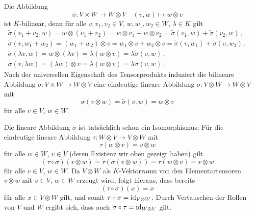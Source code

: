 \begin{example}
\begin{itemize}
      Die Abbildung
      \[
                \tilde{\sigma}
        \colon  V \times W
        \to     W \otimes V
        \quad   (v,w)
        \mapsto w \otimes v
      \]
      ist $K$-bilinear, denn für alle $v, v_1, v_2 \in V$, $w, w_1, w_2 \in W$, $\lambda \in K$ gilt
      \begin{gather*}
          \tilde{\sigma}(v_1 + v_2, w)
        = w \otimes (v_1 + v_2)
        = w \otimes v_1 + w \otimes v_2
        = \tilde{\sigma}(v_1, w) + \tilde{\sigma}(v_2, w) \,,
        \\
          \tilde{\sigma}(v, w_1 + w_2)
        = (w_1 + w_2) \otimes v
        = w_1 \otimes v + w_2 \otimes v
        = \tilde{\sigma}(v, w_1) + \tilde{\sigma}(v, w_2) \,,
        \\
          \tilde{\sigma}(\lambda v, w)
        = w \otimes (\lambda v)
        = \lambda (w \otimes v)
        = \lambda \tilde{\sigma}(v, w) \,,
        \\
          \tilde{\sigma}(v, \lambda w)
        = (\lambda w) \otimes v
        = \lambda (w \otimes v)
        = \lambda \tilde{\sigma}(v, w) \,.
      \end{gather*}
      Nach der universellen Eigenschaft des Tensorprodukts induziert die bilineare Abbildung $\tilde{\sigma} \colon V \times W \to W \otimes V$ eine eindeutige lineare Abbildung $\sigma \colon V \otimes W \to W \otimes V$ mit
      \[
          \sigma(v \otimes w)
        = \tilde{\sigma}(v, w)
        = w \otimes v
      \]
      für alle $v \in V$, $w \in W$.
      
      Die lineare Abbildung $\sigma$ ist tatsächlich schon ein Isomorphismus:
      Für die eindeutige lineare Abbildung $\tau \colon W \otimes V \to V \otimes W$ mit
      \[
          \tau(w \otimes v)
        = v \otimes w
      \]
      für alle $w \in W$, $v \in V$ (deren Existenz wir oben gezeigt haben) gilt
      \[
          (\tau \circ \sigma)(v \otimes w)
        = \tau(\sigma(v \otimes w))
        = \tau(w \otimes v)
        = v \otimes w
      \]
      für alle $v \in V$, $w \in W$.
      Da $V \otimes W$ als $K$-Vektorraum von den Elementartensoren $v \otimes w$ mit $v \in V$, $w \in W$ erzeugt wird, folgt hieraus, dass bereits
      \[
          (\tau \circ \sigma)(x)
        = x
      \]
      für alle $x \in V \otimes W$ gilt, und somit $\tau \circ \sigma = \operatorname{id}_{V \otimes W}$.
      Durch Vertauschen der Rollen von $V$ und $W$ ergibt sich, dass auch $\sigma \circ \tau = \operatorname{id}_{W \otimes V}$ gilt.
  \end{itemize}
\end{example}




